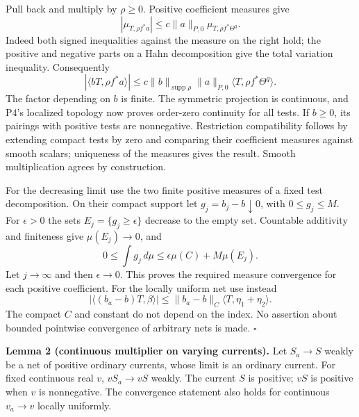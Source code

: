 \documentclass[
  11pt,
]{article}
\begin{document}
Pull back and multiply by \(\rho\geq0\). Positive coefficient measures
give \[|\mu_{T,\rho f^*a}|\leq c\|a\|_{P,0}\mu_{T,\rho f^*\Theta^q}.\]
Indeed both signed inequalities against the measure on the right hold;
the positive and negative parts on a Hahn decomposition give the total
variation inequality. Consequently \[ |\langle bT,\rho f^*a\rangle|
 \leq c\|b\|_{\operatorname{supp}\rho}\|a\|_{P,0}
          \langle T,\rho f^*\Theta^q\rangle.                   \tag{5}\]
The factor depending on \(b\) is finite. The symmetric projection is
continuous, and P4's localized topology now proves order-zero continuity
for all tests. If \(b\geq0\), its pairings with positive tests are
nonnegative. Restriction compatibility follows by extending compact
tests by zero and comparing their coefficient measures against smooth
scalars; uniqueness of the measures gives the result. Smooth
multiplication agrees by construction.

For the decreasing limit use the two finite positive measures of a fixed
test decomposition. On their compact support let
\(g_j=b_j-b\downarrow0\), with \(0\leq g_j\leq M\). For \(\epsilon>0\)
the sets \(E_j=\{g_j\geq\epsilon\}\) decrease to the empty set.
Countable additivity and finiteness give \(\mu(E_j)\to0\), and
\[0\leq\int g_j\,d\mu\leq\epsilon\mu(C)+M\mu(E_j).\] Let \(j\to\infty\)
and then \(\epsilon\to0\). This proves the required measure convergence
for each positive coefficient. For the locally uniform net use instead
\[ |\langle(b_a-b)T,\beta\rangle|
 \leq\|b_a-b\|_C\langle T,\eta_1+\eta_2\rangle.              \tag{6}\]
The compact \(C\) and constant do not depend on the index. No assertion
about bounded pointwise convergence of arbitrary nets is made.
\(\square\)

\textbf{Lemma 2 (continuous multiplier on varying currents).} Let
\(S_a\to S\) weakly be a net of positive ordinary currents, whose limit
is an ordinary current. For fixed continuous real \(v\), \(vS_a\to vS\)
weakly. The current \(S\) is positive; \(vS\) is positive when
\(v\) is nonnegative. The convergence statement also holds for continuous
\(v_a\to v\) locally uniformly.
\end{document}
